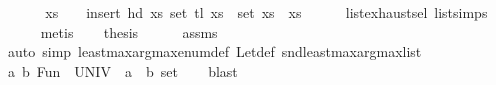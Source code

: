 \begin{isabellebody}
%
\isadelimproof
%
\endisadelimproof
%
\isatagproof
{}\isamarkupfalse%
\ {\isacharminus}{\kern0pt}\isanewline
\ \ \isamarkupfalse%
\ {\isacharasterisk}{\kern0pt}{\isacharcolon}{\kern0pt}\ {\isachardoublequoteopen}xs\ {\isasymnoteq}\ {\isacharbrackleft}{\kern0pt}{\isacharbrackright}{\kern0pt}\ {\isasymLongrightarrow}\ insert\ {\isacharparenleft}{\kern0pt}hd\ xs{\isacharparenright}{\kern0pt}\ {\isacharparenleft}{\kern0pt}set\ {\isacharparenleft}{\kern0pt}tl\ xs{\isacharparenright}{\kern0pt}{\isacharparenright}{\kern0pt}\ {\isacharequal}{\kern0pt}\ set\ xs{\isachardoublequoteclose}\ \ xs\isanewline
\ \ \ \ \isamarkupfalse%
\ list{\isachardot}{\kern0pt}exhaust{\isacharunderscore}{\kern0pt}sel\ list{\isachardot}{\kern0pt}simps{\isacharparenleft}{\kern0pt}{}{}{\isacharparenright}{\kern0pt}\isanewline
\ \ \ \ \isamarkupfalse%
\ metis\isanewline
\ \ \isamarkupfalse%
\ {\isacharquery}{\kern0pt}thesis\isanewline
\ \ \ \ \isamarkupfalse%
\ assms\isanewline
\ \ \ \ \isamarkupfalse%
\ {\isacharparenleft}{\kern0pt}auto\ simp{\isacharcolon}{\kern0pt}\ least{\isacharunderscore}{\kern0pt}max{\isacharunderscore}{\kern0pt}arg{\isacharunderscore}{\kern0pt}max{\isacharunderscore}{\kern0pt}enum{\isacharunderscore}{\kern0pt}def\ Let{\isacharunderscore}{\kern0pt}def\ snd{\isacharunderscore}{\kern0pt}least{\isacharunderscore}{\kern0pt}max{\isacharunderscore}{\kern0pt}arg{\isacharunderscore}{\kern0pt}max{\isacharunderscore}{\kern0pt}list\ {\isacharasterisk}{\kern0pt}{\isacharparenright}{\kern0pt}\isanewline
{}\isamarkupfalse%
%
\endisatagproof
{\isafoldproof}%
%
\isadelimproof
%
\endisadelimproof
%
\isadelimdocument
%
\endisadelimdocument
%
\isatagdocument
%
\isamarkuptrue%
%
\endisatagdocument
{\isafolddocument}%
%
\isadelimdocument
%
\endisadelimdocument
{}\isamarkupfalse%
\ {\isacharparenleft}{\kern0pt}{\isacharprime}{\kern0pt}a{\isacharcomma}{\kern0pt}\ {\isacharprime}{\kern0pt}b{\isacharparenright}{\kern0pt}\ Fun\ {\isacharequal}{\kern0pt}\ {\isachardoublequoteopen}UNIV\ {\isacharcolon}{\kern0pt}{\isacharcolon}{\kern0pt}\ {\isacharparenleft}{\kern0pt}{\isacharprime}{\kern0pt}a\ {\isasymRightarrow}\ {\isacharprime}{\kern0pt}b{\isacharparenright}{\kern0pt}\ set{\isachardoublequoteclose}\isanewline
%
\isadelimproof
\ \ %
\endisadelimproof
%
\isatagproof
{}\isamarkupfalse%
\ blast%
\endisatagproof
{\isafoldproof}%
%
\isadelimproof
\isanewline

\end{isabellebody}
